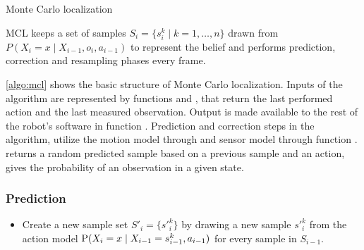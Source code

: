 \begin{algorithm}[p]
	\samples \assign \initialize{}\;
	\Forever{}{
		\samples \assign \predict{\samples, \getAction{}}\;
		\weights \assign \correct{\samples, \getObservation{}}\;
		\samples \assign \resample{\samples, \weights}\;
		\BlankLine
		\outputPosition{\samples}
	}

	\BlankLine
	\BlankLine
	\BlankLine

	\BlankLine
	\BlankLine
	\BlankLine

	\BlankLine
	\BlankLine
	\BlankLine
	\caption{Monte Carlo localization}
	\label{algo:mcl}
\end{algorithm}

MCL keeps a set of samples \(S_i = \{s^k_{i} \mid k = 1,\dotsc,n\} \) drawn from
\(P(X_i = x \mid X_{i-1}, o_i, a_{i - 1})\) to represent the belief and performs
prediction, correction and resampling phases every frame.

\autoref{algo:mcl} shows the basic structure of Monte Carlo localization.
Inputs of the algorithm are represented by functions
\getAction{} and \getObservation{}, that return the last performed action and the
last measured observation.
Output is made available to the rest of the robot's software in function \outputPosition{}.
Prediction and correction steps in the algorithm, utilize the motion
model through \sampleFromActionModel{} and sensor model through function \observationProbability{}.
\sampleFromActionModel{} returns a random predicted sample based on a previous sample and an action,
\observationProbability{} gives the probability of an observation in a given state.


\subsubsection{Prediction}
	\begin{itemize}
	\item
	Create a new sample set \(S'_i = \{s'^k_{i}\} \)
	by drawing a new sample \(s'^k_{i}\)
	from the action model \(\operatorname{\mathrm{P}}(X_i = x \mid X_{i-1} = s^k_{i-1}, a_{i - 1})\)
	for every sample in \(S_{i-1}\).
	\end{itemize}

